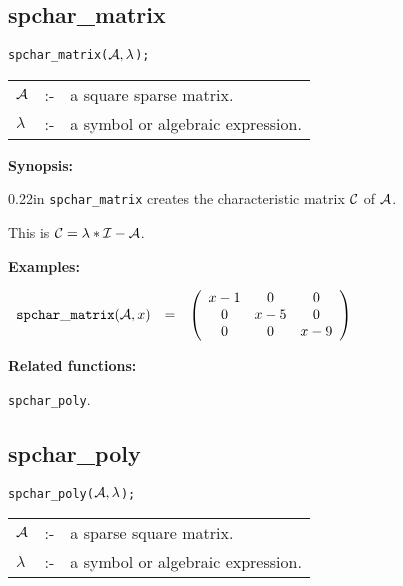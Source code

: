 \subsection{spchar\_matrix}

\hspace*{0.175in} {\tt spchar\_matrix(${\cal A},\lambda$);}

\hspace*{0.1in} 
\begin{tabular}{l l l}
${\cal A}$ &:-& a square sparse matrix. \\
$\lambda$  &:-& a symbol or algebraic expression. 
\end{tabular}

{\bf Synopsis:} 

\begin{addtolength}{\leftskip}{0.22in}
{\tt spchar\_matrix} creates the characteristic matrix ${\cal C}$ of 
${\cal A}$.

This is ${\cal C} = \lambda * {\cal I} - {\cal A}$. 

\end{addtolength}

{\bf Examples:}

\begin{flushleft}  
\hspace*{0.1in}
\begin{math}  
\begin{array}{ccc}
{\tt spchar\_matrix}({\cal A},x) & = & 
\left( \begin{array}{ccc} x-1 & 0 & 0 \\ 0 & x-5 & 0 \\ 0 & 0 & x-9 
\end{array} \right)  
\end{array}  
\end{math}  
\end{flushleft}

{\bf Related functions:}

\hspace*{0.175in} {\tt spchar\_poly}. 


\subsection{spchar\_poly}

\hspace*{0.175in} {\tt spchar\_poly(${\cal A},\lambda$);}

\hspace*{0.1in} 
\begin{tabular}{l l l}
${\cal A}$ &:-& a sparse square matrix. \\
$\lambda$ &:-& a symbol or algebraic expression.
\end{tabular}

